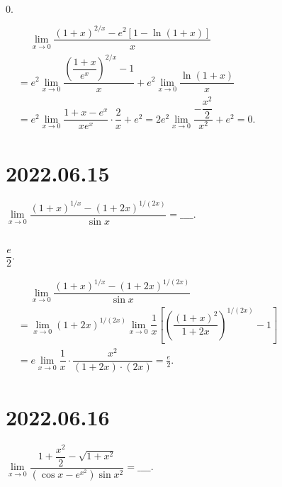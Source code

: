 \documentclass[lang=cn,12pt]{elegantbook}
\begin{document}
\begin{solution}
  $0.$

  $\begin{aligned}
  & \quad\ \lim\limits_{x \to 0} \dfrac{\left(1+x\right)^{2/x} - e^2\left[1-\ln(1+x)\right]}{x} \\
  &= e^2 \lim\limits_{x \to 0} \dfrac{\left(\dfrac{1+x}{e^x}\right)^{2/x} - 1}{x} + e^2\lim\limits_{x \to 0} \dfrac{\ln(1+x)}{x}\\
  &= e^2 \lim\limits_{x \to 0} \dfrac{1+x-e^x}{xe^x} \cdot \dfrac{2}{x} + e^2
  = 2e^2 \lim\limits_{x \to 0} \dfrac{-\dfrac{x^2}{2}}{x^2} + e^2 = 0.
  \end{aligned}
  $

\end{solution}


\section*{2022.06.15}

$\lim\limits_{x \to 0} \dfrac{\left(1+x\right)^{1/x} - \left(1+2x\right)^{1/(2x)} }{\sin x} = \_\_\_\_.$
\\ \\

\begin{solution}
  $\dfrac{e}{2}.$

  $\begin{aligned}
  & \quad\ \lim\limits_{x \to 0} \dfrac{\left(1+x\right)^{1/x} - \left(1+2x\right)^{1/(2x)} }{\sin x} \\
  &= \lim\limits_{x \to 0} \left(1+2x\right)^{1/(2x)} 
    \lim\limits_{x \to 0} \dfrac{1}{x} \left[\left(\dfrac{(1+x)^2}{1+2x}\right)^{1/(2x)} - 1\right]\\
  &= e \lim\limits_{x \to 0} \dfrac{1}{x}\cdot \dfrac{x^2}{(1+2x)\cdot(2x)}=\frac{e}{2}.
  \end{aligned}
  $

\end{solution}

\newpage

\section*{2022.06.16}

$\lim\limits_{x \to 0} \dfrac{1+\dfrac{x^2}{2} - \sqrt{1+x^2}}{(\cos x - e^{x^2})\sin x^2} = \_\_\_\_.$
\\ \\
\end{document}
